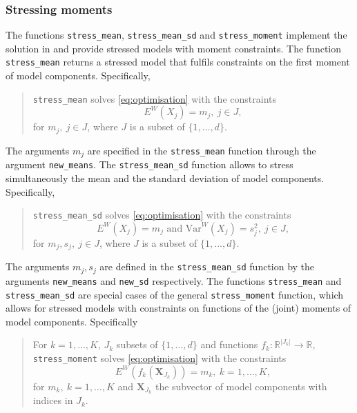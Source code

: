 \documentclass[
]{article}
\begin{document}
\hypertarget{stressing-moments}{%
\subsubsection{Stressing moments}\label{stressing-moments}}

The functions \texttt{stress\_mean}, \texttt{stress\_mean\_sd} and \texttt{stress\_moment} implement the solution in \citet{Csiszar1975dAP} and provide stressed models with moment constraints. The function \texttt{stress\_mean} returns a stressed model that fulfils constraints on the first moment of model components. Specifically,

\begin{quote}
\texttt{stress\_mean} solves \eqref{eq:optimisation} with the constraints
\begin{equation} 
E^W(X_j) = m_j, ~j \in J, \label{eq:optimisationmean}
\end{equation}
for \(m_j, ~ j \in J\), where \(J\) is a subset of \(\{1, \ldots, d\}\).
\end{quote}

The arguments \(m_j\) are specified in the \texttt{stress\_mean} function through the argument \texttt{new\_means}. The \texttt{stress\_mean\_sd} function allows to stress simultaneously the mean and the standard deviation of model components. Specifically,

\begin{quote}
\texttt{stress\_mean\_sd} solves \eqref{eq:optimisation} with the constraints
\begin{equation} 
E^W(X_j) = m_j \text{ and Var}^W(X_j) = s_j^2 , ~j \in J, \label{eq:optimisationmeansd}
\end{equation}
for \(m_j, s_j, ~ j \in J\), where \(J\) is a subset of \(\{1, \ldots, d\}\).
\end{quote}

The arguments \(m_j, s_j\) are defined in the \texttt{stress\_mean\_sd} function by the arguments \texttt{new\_means} and \texttt{new\_sd} respectively. The functions \texttt{stress\_mean} and \texttt{stress\_mean\_sd} are special cases of the general \texttt{stress\_moment} function, which allows for stressed models with constraints on functions of the (joint) moments of model components. Specifically

\begin{quote}
For \(k = 1, \ldots, K\), \(J_k\) subsets of \(\{1, \ldots, d\}\) and functions \(f_k \colon \mathbb{R}^{|J_k|} \to \mathbb{R}\), \texttt{stress\_moment} solves \eqref{eq:optimisation} with the constraints
\begin{equation} 
E^W(f_k(\mathbf X_{J_k}) ) = m_k, ~k = 1, \ldots, K, \label{eq:optimisationmoment}
\end{equation}
for \(m_k, ~k=1, \dots,K\) and \(\mathbf X_{J_k}\) the subvector of model components with indices in \(J_k\).
\end{quote}
\end{document}
